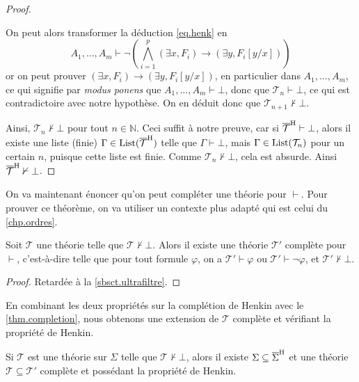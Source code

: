 \begin{proof}
\begin{itemize}
    On peut alors transformer la déduction \ref{eq.henk} en
    \[A_1,\ldots,A_m\vdash \lnot \left(\bigwedge_{i = 1}^p (\exists x, F_i)\to
    (\exists y, F_i[y/x])\right)\]
    or on peut prouver $(\exists x, F_i) \to (\exists y, F_i[y/x])$, en
    particulier dans $A_1,\ldots,A_m$, ce qui signifie par
    \textit{modus ponens} que $A_1,\ldots,A_m\vdash \bot$, donc que
    $\mathcal T_n\vdash \bot$, ce qui est contradictoire avec notre hypothèse.
    On en déduit donc que $\mathcal T_{n+1}\nvdash\bot$.
  \end{itemize}

  Ainsi, $\mathcal T_n\nvdash\bot$ pour tout $n\in \mathbb N$. Ceci suffit à
  notre preuve, car si $\overline{\mathcal T}^{\mathrm H}\vdash \bot$, alors il existe une
  liste (finie) $\Gamma\in\operatorname{List}(\overline{\mathcal T}^{\mathrm H})$ telle que
  $\Gamma\vdash\bot$, mais $\Gamma\in\operatorname{List}(\mathcal T_n)$ pour un certain $n$,
  puisque cette liste est finie. Comme $\mathcal T_n\nvdash\bot$, cela est
  absurde. Ainsi $\overline{\mathcal T}^{\mathrm H}\nvdash\bot$.
\end{proof}

On va maintenant énoncer qu'on peut compléter une théorie pour $\vdash$. Pour
prouver ce théorème, on va utiliser un contexte plus adapté qui est celui du
\cref{chp.ordres}.

\begin{theorem}\label{thm.completion}
  Soit $\mathcal T$ une théorie telle que $\mathcal T \nvdash \bot$. Alors il
  existe une théorie $\mathcal T'$ complète pour $\vdash$, c'est-à-dire telle
  que pour tout formule $\varphi$, on a $\mathcal T'\vdash \varphi$ ou
  $\mathcal T'\vdash \lnot \varphi$, et $\mathcal T'\nvdash\bot$.
\end{theorem}

\begin{proof}
  Retardée à la \cref{sbsct.ultrafiltre}.
\end{proof}

En combinant les deux propriétés sur la complétion de Henkin avec le
\cref{thm.completion}, nous obtenons une extension de $\mathcal T$ complète et
vérifiant la propriété de Henkin.

\begin{lemma}
  Si $\mathcal T$ est une théorie sur $\Sigma$ telle que
  $\mathcal T\not\vdash\bot$, alors il existe $\Sigma\subseteq\overline{\Sigma}^{\mathrm H}$
  et une théorie $\mathcal T\subseteq\mathcal T'$ complète et possédant la
  propriété de Henkin.
\end{lemma}

